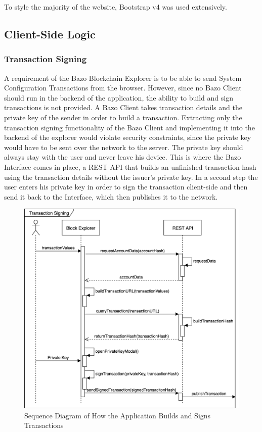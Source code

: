 To style the majority of the website, Bootstrap v4 was used extensively.
\subsection{Client-Side Logic} \label{sec:clientside}

\subsubsection{Transaction Signing} \label{txsigning}
A requirement of the Bazo Blockchain Explorer is to be able to send System Configuration Transactions from the browser. 
However, since no Bazo Client should run in the backend of the application, the ability to build and sign transactions is not provided. A Bazo Client takes transaction details and the private key of the sender in order to build a transaction. Extracting only the transaction signing functionality of the Bazo Client and implementing it into the backend of the explorer would violate security constraints, since the private key would have to be sent over the network to the server. The private key should always stay with the user and never leave his device. This is where the Bazo Interface comes in place, a REST API that builds an unfinished transaction hash using the transaction details without the issuer's private key. In a second step the user enters his private key in order to sign the transaction client-side and then send it back to the Interface, which then publishes it to the network.

\begin{figure}
  \includegraphics[scale=0.35]{transactionbuilding.png}
  \centering
  \caption{Sequence Diagram of How the Application Builds and Signs Transactions}
  \label{fig:sequence1}
\end{figure}

